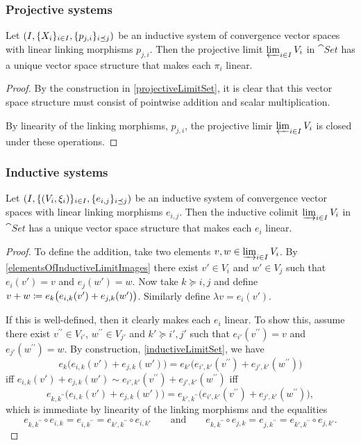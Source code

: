 \subsubsection{Projective systems}
\begin{proposition} \label{vectorSpaceProjectiveLimit}
Let $\sSet{I, \{X_i\}_{i\in I}, \{p_{j,i}\}_{i\preceq j}}$ be an inductive system of convergence vector spaces with linear linking morphisms $p_{j,i}$. Then the projective limit $\varprojlim_{i\in I} V_i$ in $\cat{Set}$ has a unique vector space structure that makes each $\pi_i$ linear.
\end{proposition}
\begin{proof}
By the construction in \ref{projectiveLimitSet}, it is clear that this vector space structure must consist of pointwise addition and scalar multiplication.

By linearity of the linking morphisms, $p_{j,i}$, the projective limir $\varprojlim_{i\in I}V_i$ is closed under these operations.
\end{proof}


\subsubsection{Inductive systems}
\begin{proposition} \label{vectorSpaceInductiveLimit}
Let $\sSet{I, \{\sSet{V_i, \xi_i}\}_{i\in I}, \{e_{i,j}\}_{i\preceq j}}$ be an inductive system of convergence vector spaces with linear linking morphisms $e_{i,j}$. Then the inductive colimit $\varinjlim_{i\in I} V_i$ in $\cat{Set}$ has a unique vector space structure that makes each $e_i$ linear.
\end{proposition}
\begin{proof}
To define the addition, take two elements $v,w\in \varinjlim_{i\in I} V_i$. By \ref{elementsOfInductiveLimitImages} there exist $v'\in V_i$ and $w'\in V_j$ such that $e_i(v') = v$ and $e_j(w') = w$. Now take $k \succeq i,j$ and define $v+w \coloneqq e_k\big(e_{i,k}(v') + e_{j,k}(w')\big)$. Similarly define $\lambda v = e_i(v')$.

If this is well-defined, then it clearly makes each $e_i$ linear. To show this, assume there exist $v^{\prime\prime}\in V_{i'}$, $w^{\prime\prime}\in V_{j'}$ and $k' \succeq i',j'$ such that $e_{i'}(v^{\prime\prime}) = v$ and $e_{j'}(w^{\prime\prime}) = w$. By construction, \ref{inductiveLimitSet}, we have
\[ e_k\big(e_{i,k}(v') + e_{j,k}(w')\big) = e_{k'}\big(e_{i',k'}(v^{\prime\prime}) + e_{j',k'}(w^{\prime\prime})\big) \]
iff $e_{i,k}(v') + e_{j,k}(w') \sim e_{i',k'}(v^{\prime\prime}) + e_{j',k'}(w^{\prime\prime})$ iff 
\[ e_{k,k^{\prime\prime}}\big(e_{i,k}(v') + e_{j,k}(w')\big) = e_{k',k^{\prime\prime}}\big(e_{i',k'}(v^{\prime\prime}) + e_{j',k'}(w^{\prime\prime})\big), \]
which is immediate by linearity of the linking morphisms and the equalities
\[ e_{k,k^{\prime\prime}} \circ e_{i,k} = e_{i,k^{\prime\prime}} = e_{k',k^{\prime\prime}} \circ e_{i,k'} \qquad\text{and}\qquad e_{k,k^{\prime\prime}} \circ e_{j,k} = e_{j,k^{\prime\prime}} = e_{k',k^{\prime\prime}} \circ e_{j,k'}. \]
\end{proof}

